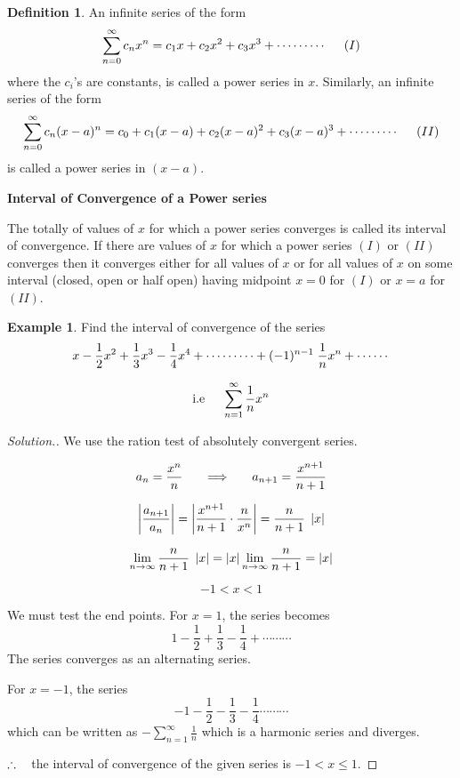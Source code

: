 \documentclass[11pt,a4paper]{article}
\theoremstyle{definition}
\newtheorem{defn}[thm]{Definition}
\newtheorem{exa}[thm]{Example}
\newenvironment{solution}
  {\renewcommand{\qedsymbol}{}\begin{proof}[\textit{Solution}.]}
  {\end{proof}}
\newcommand{\subhead}[1]{%
  \par\medskip\noindent\textbf{#1}\par\nobreak\smallskip}
\begin{document}
\begin{defn}


An infinite series of the form $$\sum^{\infty}_{n = 0} c_n x^n = c_1x + c_2x^2 + c_3x^3 + \cdots\cdots\cdots \hspace{0.5cm} (I)$$ where the $c_i$'s are constants, is called a power series in $x$. Similarly, an infinite series of the form 
$$\sum^{\infty}_{n = 0} c_n (x-a)^n =c_0 +  c_1(x-a) + c_2(x-a)^2 + c_3(x-a)^3 + \cdots\cdots\cdots \hspace{0.5cm} (II)$$ is called a power series in $(x -a)$.
\end{defn}


\subhead{Interval of Convergence of a Power series}


The totally of values of  $x$ for which a power series converges is called its interval of convergence. If there are values of $x$ for which a power series  $(I)$ or $(II)$ converges then it converges either for all values of $x$ or for all values of $x$ on some interval (closed, open or half open) having midpoint $x = 0$ for $(I)$ or $x=a$ for $(II)$.


\begin{exa}


Find the interval of convergence of the series $$x - \frac{1}{2}x^2 + \frac{1}{3}x^3 - \frac{1}{4}x^4 + \cdots\cdots\cdots + (-1)^{n-1} \hspace{0.1cm} \frac{1}{n}x^n + \cdots\cdots$$

$$\text{i.e}\hspace{0.5cm} \sum^{\infty}_{n = 1}\frac{1}{n}x^n $$
\end{exa}


\begin{solution}


We use the ration test of absolutely convergent series.

$$a_n= \dfrac{x^n}{n}\hspace{0.5cm}\implies\hspace{0.5cm} a_{n + 1} = \frac{x^{n+1}}{n + 1}$$

$$\left|\dfrac{a_{n+1}}{a_n}\right| = \left|\dfrac{x^{n+ 1}}{n+ 1}\cdot \dfrac{n}{x^n}\right| = \dfrac{n}{n + 1}\hspace{0.1cm}\left|x\right|$$

$$\lim_{n\rightarrow \infty} \dfrac{n}{n + 1}\hspace{0.1cm}\left|x\right| = \left|x\right|\lim_{n\rightarrow \infty} \dfrac{n}{n + 1} = \left|x\right|$$

$$-1 < x<1$$

We must test the end points. For $x = 1$, the series becomes $$1 - \dfrac{1}{2} + \dfrac{1}{3} - \dfrac{1}{4} + \cdots\cdots\cdots$$ The series converges as an alternating series.


For $x = -1$, the series $$-1 - \dfrac{1}{2} - \dfrac{1}{3} - \frac{1}{4}\cdots\cdots\cdots$$ which can be written as $\displaystyle{-\sum^{\infty}_{n=1} \frac{1}{n}}$ which is a harmonic series and diverges.


$\therefore\hspace{0.3cm}$ the interval of convergence of the given series is $-1< x\leq 1$.
\end{solution}
\end{document}
